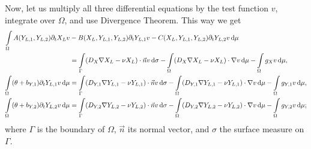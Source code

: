\documentclass[11pt]{article}
\begin{document}
Now, let us multiply all three differential equations by the test function \(v\), integrate over \(\Omega\), and use Divergence Theorem. This way we get
\begin{subequations}
\begin{align}
    \int\limits_\Omega
    A(Y_{L,1}, Y_{L,2}) \partial_t X_L v &- B(X_L, Y_{L,1}, Y_{L,2}) \partial_t Y_{L,1} v - C(X_L, Y_{L,1}, Y_{L,2}) \partial_t Y_{L,2} v \dif \mu 
    \notag
    \\
    &=
    \int\limits_\Gamma
    (D_X \nabla X_L - \nu X_L) \cdot \vec{n} v
    \dif \sigma
    -\int\limits_\Omega
    (D_X \nabla X_L - \nu X_L) \cdot \nabla v  \dif \mu
    -\int\limits_\Omega g_X v \dif \mu,
    \\
    \int\limits_\Omega (\theta + b_{Y,1}) \partial_t Y_{L,1} v \dif \mu  &=
    \int\limits_\Gamma (D_{Y,1} \nabla Y_{L,1} - \nu Y_{L,1}) \cdot \vec{n} v \dif\sigma
    -\int\limits_\Omega (D_{Y,1} \nabla Y_{L,1} - \nu Y_{L,1}) \cdot \nabla v \dif\mu - \int\limits_\Omega g_{Y,1} v \dif\mu,
    \\
    \int\limits_\Omega (\theta + b_{Y,2}) \partial_t Y_{L,2} v \dif\mu  &= \int\limits_\Gamma (D_{Y,2} \nabla Y_{L,2} - \nu Y_{L,2}) \cdot \vec{n} v \dif\sigma - 
    \int\limits_\Omega (D_{Y,2} \nabla Y_{L,2} - \nu Y_{L,2}) \cdot \nabla v \dif\mu - \int\limits_\Omega g_{Y,2} v \dif\mu;
\end{align}
\end{subequations}
where $\Gamma$ is the boundary of $\Omega$, $\vec{n}$ its normal vector, and $\sigma$ the surface measure on $\Gamma$. 
\end{document}
